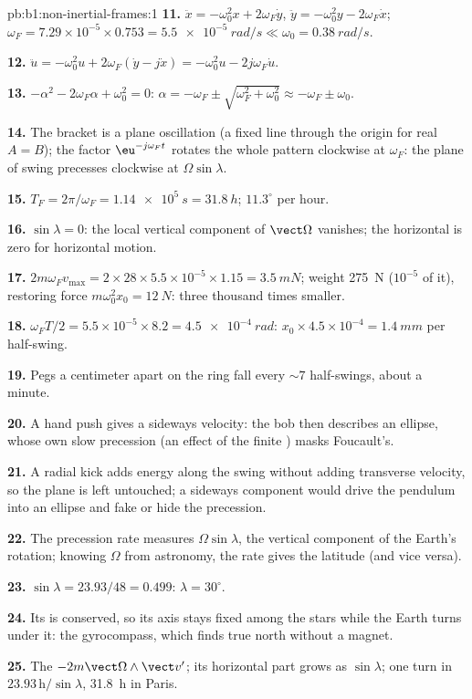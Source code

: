 \begin{solution}{pb:b1:non-inertial-frames:1}
\textbf{11.} $\ddot x = -\omega_0^2x + 2\omega_F\dot y$, $\ddot y = -\omega_0^2y -
2\omega_F\dot x$; $\omega_F = 7.29\times10^{-5} \times 0.753 = \qty{5.5e-5}{rad/s}
\ll \omega_0 = \qty{0.38}{rad/s}$.

\textbf{12.} $\ddot u = -\omega_0^2u + 2\omega_F(\dot y - j\dot x) = -\omega_0^2u -
2j\omega_F\dot u$.

\textbf{13.} $-\alpha^2 - 2\omega_F\alpha + \omega_0^2 = 0$: $\alpha = -\omega_F \pm
\sqrt{\omega_F^2 + \omega_0^2} \approx -\omega_F \pm \omega_0$.

\textbf{14.} The bracket is a plane oscillation (a fixed line through the
origin for real $A = B$); the factor $\eu^{-j\omega_Ft}$ rotates the whole
pattern clockwise at $\omega_F$: the plane of swing precesses clockwise at
$\Omega\sin\lambda$.

\textbf{15.} $T_F = 2\pi/\omega_F = \qty{1.14e5}{s} = \qty{31.8}{h}$; $11.3^\circ$
per hour.

\textbf{16.} $\sin\lambda = 0$: the local vertical component of $\vect\Omega$
vanishes; the horizontal  is zero for horizontal motion.

\textbf{17.} $2m\omega_Fv_{\max} = 2 \times 28 \times 5.5\times10^{-5} \times 1.15 =
\qty{3.5}{mN}$; weight \qty{275}{N} ($10^{-5}$ of it), restoring force
$m\omega_0^2x_0 = \qty{12}{N}$: three thousand times smaller.

\textbf{18.} $\omega_FT/2 = 5.5\times10^{-5} \times 8.2 = \qty{4.5e-4}{rad}$:
$x_0 \times 4.5\times10^{-4} = \qty{1.4}{mm}$ per half-swing.

\textbf{19.} Pegs a centimeter apart on the ring fall every $\sim 7$
half-swings, about a minute.

\textbf{20.} A hand push gives a sideways velocity: the bob then
describes an ellipse, whose own slow precession (an effect of the
finite ) masks Foucault's.

\textbf{21.} A radial kick adds energy along the swing without adding
transverse velocity, so the plane is left untouched; a sideways
component would drive the pendulum into an ellipse and fake or hide the
precession.

\textbf{22.} The precession rate measures $\Omega\sin\lambda$, the vertical
component of the Earth's rotation; knowing $\Omega$ from astronomy, the
rate gives the latitude (and vice versa).

\textbf{23.} $\sin\lambda = 23.93/48 = 0.499$: $\lambda = 30^\circ$.

\textbf{24.} Its  is conserved, so its axis stays fixed
among the stars while the Earth turns under it: the gyrocompass, which
finds true north without a magnet.

\textbf{25.} The  $-2m\vect\Omega\wedge\vect v'$; its horizontal
part grows as $\sin\lambda$; one turn in $23.93\,\text{h}/\sin\lambda$,
\qty{31.8}{h} in Paris.
\end{solution}
